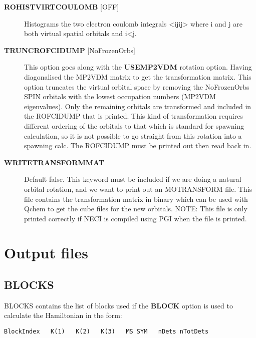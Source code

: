 \documentclass[openany,a4paper,10pt,english]{manual}
\begin{document}
\begin{description}
\item[\textbf{ROHISTVIRTCOULOMB} {[}OFF{]}] \leavevmode
Histograms the two electron coulomb integrals \textless{}ij\textbar{}ij\textgreater{} where i and j are both virtual spatial orbitals
and i\textless{}j.

\item[\textbf{TRUNCROFCIDUMP} {[}NoFrozenOrbs{]}] \leavevmode
This option goes along with the \textbf{USEMP2VDM} rotation option.  Having diagonalised the MP2VDM
matrix to get the transformation matrix.  This option truncates the virtual orbital space by removing
the NoFrozenOrbs SPIN orbitals with the lowest occupation numbers (MP2VDM eigenvalues).  Only the
remaining orbitals are transformed and included in the ROFCIDUMP that is printed.
This kind of transformation requires different ordering of the orbitals to that which is standard for
spawning calculation, so it is not possible to go straight from this rotation into a spawning calc.
The ROFCIDUMP must be printed out then read back in.

\item[\textbf{WRITETRANSFORMMAT}] \leavevmode
Default false.
This keyword must be included if we are doing a natural orbital rotation, and we want to print out
an MOTRANSFORM file.  This file contains the transformation matrix in binary which can be used with
Qchem to get the cube files for the new orbitals.  NOTE: This file is only printed correctly if NECI
is compiled using PGI when the file is printed.

\end{description}

\resetcurrentobjects
\hypertarget{--doc-output/index}{}

\hypertarget{output-index}{}\chapter{Output files}

\resetcurrentobjects
\hypertarget{--doc-output/blocks}{}

\hypertarget{output-blocks}{}\section{BLOCKS}

BLOCKS contains the list of blocks used if the \textbf{BLOCK} option is used to
calculate the Hamiltonian in the form:

\begin{Verbatim}[commandchars=@\[\]]
BlockIndex   K(1)   K(2)   K(3)   MS SYM   nDets nTotDets
\end{Verbatim}
\end{document}
